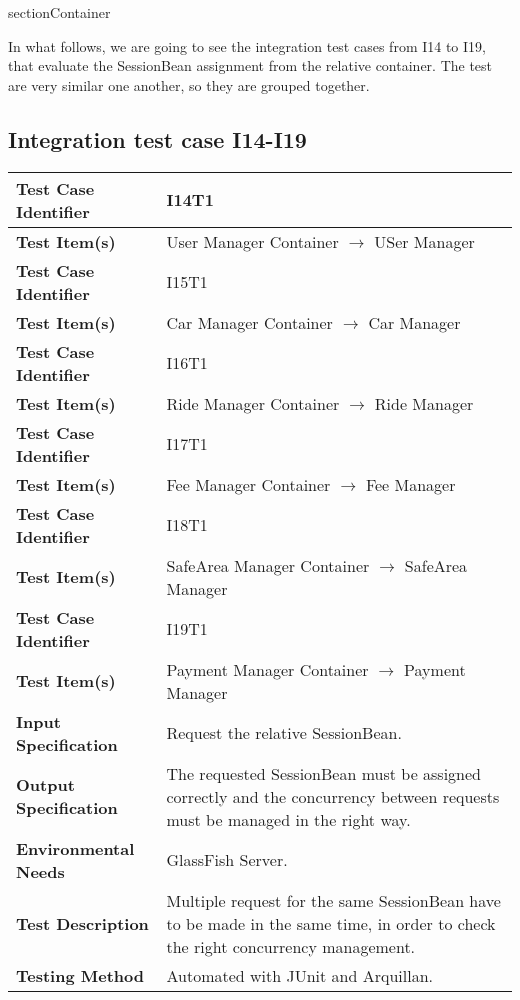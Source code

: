 section{Container}

In what follows, we are going to see the integration test cases from I14 to I19, that evaluate the SessionBean assignment from the relative container. The test are very similar one another, so they are grouped together.

\subsection{Integration test case I14-I19}

\begin{tabular}{l p{}}
    \hline
    \textbf{Test Case Identifier} & I14T1\\
    \hline
    \textbf{Test Item(s)} & User Manager Container $\rightarrow$ USer Manager \\
    \hline
    \hline
    \textbf{Test Case Identifier} & I15T1\\
    \hline
    \textbf{Test Item(s)} & Car Manager Container $\rightarrow$ Car Manager \\
    \hline
    \hline
    \textbf{Test Case Identifier} & I16T1\\
    \hline
    \textbf{Test Item(s)} & Ride Manager Container $\rightarrow$ Ride Manager \\
    \hline
    \hline
    \textbf{Test Case Identifier} & I17T1\\
    \hline
    \textbf{Test Item(s)} & Fee Manager Container $\rightarrow$ Fee Manager \\
    \hline
    \hline
    \textbf{Test Case Identifier} & I18T1\\
    \hline
    \textbf{Test Item(s)} & SafeArea Manager Container $\rightarrow$ SafeArea Manager \\
    \hline
    \hline
    \textbf{Test Case Identifier} & I19T1\\
    \hline
    \textbf{Test Item(s)} & Payment Manager Container $\rightarrow$ Payment Manager \\
    \hline
    \hline
    \textbf{Input Specification} & Request the relative SessionBean. \\
    \hline
    \textbf{Output Specification} & The requested SessionBean must be assigned correctly and the concurrency between requests must be managed in the right way. \\
    \hline
    \textbf{Environmental Needs} & GlassFish Server.\\
    \hline
    \textbf{Test Description} & Multiple request for the same SessionBean have to be made in the same time, in order to check the right concurrency management.\\
    \hline
    \textbf{Testing Method} & Automated with JUnit and Arquillan. \\
    \hline
\end{tabular}

